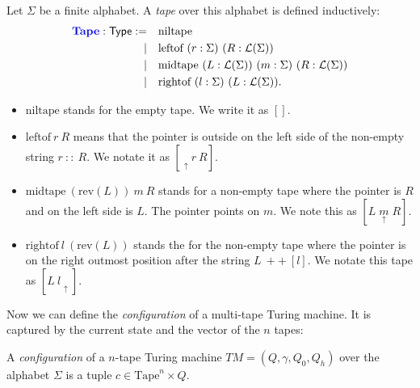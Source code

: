 \documentclass{psartcl}
\newcommand{\cons}{~ :: ~}
\newcommand{\app}{~ ++ ~}
\newcommand{\Type}{\mathsf{Type}}
\newcommand{\List}{\mathcal{L}}
\newcommand{\tape}[1]{[ #1 ]}
\newcommand{\tapePointer}[1]{\; \underset{\uparrow}{#1} \;}
\newcommand{\rev}{\txt{rev}}
\newcommand{\txt}[1]{\text{#1}}
\begin{document}
\begin{definition}[Tape]
  \label{def:tape}
  Let $\Sigma$ be a finite alphabet. A \emph{tape} over this alphabet is defined inductively:
  \begin{alignat*}{2}
    \emph{Tape} : \Type := \quad & \txt{niltape} \\
                          | \quad & \txt{leftof}  ~ (r : \Sigma) ~ (R : \List(\Sigma)) \\
                          | \quad & \txt{midtape} ~ (L : \List(\Sigma)) ~ (m : \Sigma) ~ (R : \List(\Sigma)) \\
                          | \quad & \txt{rightof} ~ (l : \Sigma) ~ (L : \List(\Sigma)). \\
  \end{alignat*}
  \begin{itemize}
    \item $\txt{niltape}$ stands for the empty tape.  We write it as $\tape{}$.
    \item $\txt{leftof}  ~ r ~ R$ means that the pointer is outside on the left side of the non-empty string $r \cons R$.  We notate it as
      $\tape{\tapePointer{} r ~ R}$.
    \item $\txt{midtape} ~ (\rev(L)) ~ m ~ R$ stands for a non-empty tape where the pointer is $R$ and on the left side is $L$. The pointer points on
      $m$.  We note this as $\tape{L \tapePointer{m} R}$.
    \item $\txt{rightof} ~ l ~ (\rev(L))$ stands the for the non-empty tape where the pointer is on the right outmost position after the string
      $L \app [l]$.  We notate this tape as $\tape{L ~ l \tapePointer{}}$.
  \end{itemize}
\end{definition}

Now we can define the \emph{configuration} of a multi-tape Turing machine.  It is captured by the current state and the vector of the $n$ tapes:

\begin{definition}[Configuration]
  \label{def:config}
  A \emph{configuration} of a $n$-tape Turing machine $TM = (Q, \gamma, Q_0, Q_h)$ over the alphabet $\Sigma$ is a tuple
  $c \in \text{Tape}^n \times Q$.
\end{definition}
\end{document}
